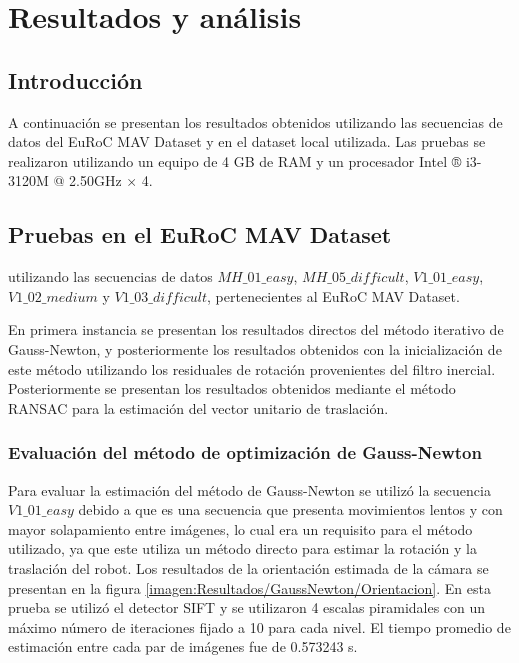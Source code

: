 \chapter{Resultados y análisis}
\label{capitulo6}

\section{Introducción}
A continuación se presentan los resultados obtenidos utilizando las secuencias de datos del EuRoC MAV Dataset y en el dataset local utilizada. Las pruebas se realizaron utilizando un equipo de 4 GB de RAM y un procesador Intel ® i3-3120M @ 2.50GHz × 4.

\section{Pruebas en el EuRoC MAV Dataset}


utilizando las secuencias de datos  $MH\_ 01\_ easy$,  $MH\_ 05\_ difficult$,  $V1\_ 01\_ easy$,
$V1\_ 02\_ medium$ y  $V1\_ 03\_ difficult$, pertenecientes al EuRoC MAV Dataset.

En primera instancia se presentan los resultados directos del método iterativo de Gauss-Newton, y posteriormente los resultados obtenidos con la inicialización de este método utilizando los residuales de rotación provenientes del filtro inercial. Posteriormente se presentan los resultados obtenidos mediante el método RANSAC para la estimación del vector unitario de traslación.


\subsection{Evaluación del método de optimización de Gauss-Newton }

Para evaluar la estimación del método de Gauss-Newton se utilizó la secuencia $V1\_ 01\_ easy$ debido a que es una secuencia que presenta movimientos lentos y con mayor solapamiento entre imágenes, lo cual era un requisito para el método utilizado, ya que este utiliza un método directo para estimar la rotación y la traslación del robot. Los resultados de la orientación estimada de la cámara se presentan en la figura \ref{imagen:Resultados/GaussNewton/Orientacion}. En esta prueba se utilizó el detector SIFT y se utilizaron 4 escalas piramidales con un máximo número de iteraciones fijado a 10 para cada nivel. El tiempo promedio de estimación entre cada par de imágenes fue de 0.573243 s.

